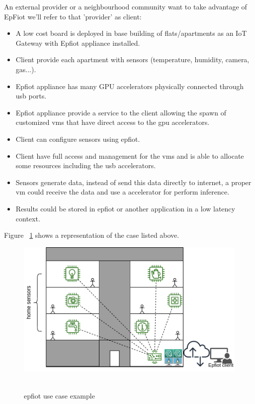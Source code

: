 An external provider or a neighbourhood community want to take advantage of EpFiot we'll refer to that 'provider' as client:
\begin{itemize}
  \item A low cost board is deployed in base building of flats/apartments as an IoT Gateway with Epfiot appliance installed.
  \item Client provide each apartment with sensors (temperature, humidity, camera, gas...).
  \item Epfiot appliance has many GPU accelerators physically connected through usb ports.
  \item Epfiot appliance provide a service to the client allowing the spawn of customized vms that have direct access to the gpu accelerators.
  \item Client can configure sensors using epfiot.
  \item Client have full access and management for the vms and is able to allocate some resources including the usb accelerators.
  \item Sensors generate data, instead of send this data directly to internet, a proper vm could receive the data and use a accelerator for perform inference.
  \item Results could be stored in epfiot or another application in a low latency context.
\end{itemize}

Figure ~\ref{figure1.2} shows a representation of the case listed above.

\begin{figure}[h]%
    \includegraphics[width=6.5in]{figures/use_case.png}
~\caption{epfiot use case example}
\label{figure1.2}
\end{figure}

